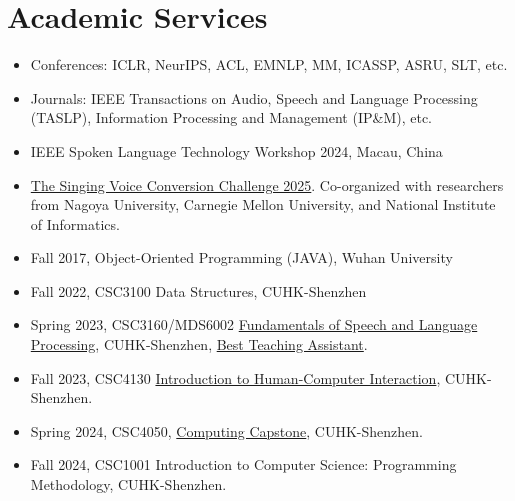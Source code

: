 \documentclass{resume}
\begin{document}
\section{Academic Services}
\begin{itemize}
  \item Conferences: ICLR, NeurIPS, ACL, EMNLP, MM, ICASSP, ASRU, SLT, etc.
  \item Journals: IEEE
        Transactions on Audio, Speech and Language Processing (TASLP), Information Processing and
        Management (IP\&M), etc.
\end{itemize}
\begin{itemize}
  \item IEEE Spoken Language Technology Workshop 2024, Macau, China
\end{itemize}
\begin{itemize}
  \item \href{https://www.vc-challenge.org/}{The Singing Voice Conversion Challenge 2025}. Co-organized with researchers from Nagoya University, Carnegie Mellon University, and National Institute of Informatics.
\end{itemize}
\begin{itemize}
  \item Fall 2017, Object-Oriented Programming (JAVA), Wuhan University
  \item Fall 2022, CSC3100 Data Structures, CUHK-Shenzhen
  \item Spring 2023, CSC3160/MDS6002
        \href{https://drwuz.com/CSC3160/index.html}{Fundamentals of Speech and Language
          Processing}, CUHK-Shenzhen,
        \href{https://www.zhangxueyao.com/data/presentations/20230521_ta_award.pdf}{Best
          Teaching Assistant}.
  \item Fall 2023, CSC4130 \href{https://stevenhan1991.github.io/CSC4130/index.html}{Introduction to Human-Computer Interaction}, CUHK-Shenzhen.
  \item Spring 2024, CSC4050, \href{https://drwuz.com/csc4050/}{Computing Capstone}, CUHK-Shenzhen.
  \item Fall 2024, CSC1001 Introduction to Computer Science: Programming Methodology, CUHK-Shenzhen.
\end{itemize}
\end{document}
